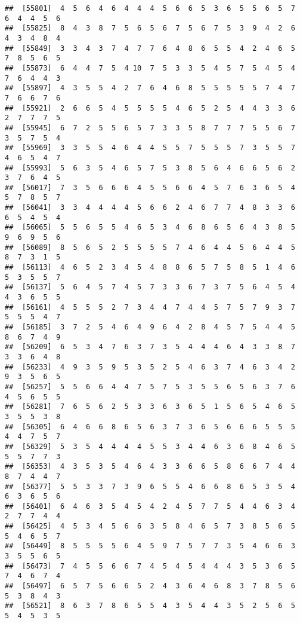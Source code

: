 \documentclass[
]{book}
\begin{document}
\begin{verbatim}
##  [55801]  4  5  6  4  6  4  4  4  5  6  6  5  3  6  5  5  6  5  7  6  4  4  5  6
##  [55825]  8  4  3  8  7  5  6  5  6  7  5  6  7  5  3  9  4  2  6  4  3  4  8  4
##  [55849]  3  3  4  3  7  4  7  7  6  4  8  6  5  5  4  2  4  6  5  7  8  5  6  5
##  [55873]  6  4  4  7  5  4 10  7  5  3  3  5  4  5  7  5  4  5  4  7  6  4  4  3
##  [55897]  4  3  5  5  4  2  7  6  4  6  8  5  5  5  5  5  7  4  7  7  6  6  7  6
##  [55921]  2  6  6  5  4  5  5  5  5  4  6  5  2  5  4  4  3  3  6  2  7  7  7  5
##  [55945]  6  7  2  5  5  6  5  7  3  3  5  8  7  7  7  5  5  6  7  3  5  7  5  4
##  [55969]  3  3  5  5  4  6  4  4  5  5  7  5  5  5  7  3  5  5  7  4  6  5  4  7
##  [55993]  5  6  3  5  4  6  5  7  5  3  8  5  6  4  6  6  5  6  2  3  7  6  4  5
##  [56017]  7  3  5  6  6  6  4  5  5  6  6  4  5  7  6  3  6  5  4  5  7  8  5  7
##  [56041]  3  3  4  4  4  4  5  6  6  2  4  6  7  7  4  8  3  3  6  6  5  4  5  4
##  [56065]  5  5  6  5  5  4  6  5  3  4  6  8  6  5  6  4  3  8  5  9  6  9  5  6
##  [56089]  8  5  6  5  2  5  5  5  5  7  4  6  4  4  5  6  4  4  5  8  7  3  1  5
##  [56113]  4  6  5  2  3  4  5  4  8  8  6  5  7  5  8  5  1  4  6  5  3  5  5  7
##  [56137]  5  6  4  5  7  4  5  7  3  3  6  7  3  7  5  6  4  5  4  4  3  6  5  5
##  [56161]  4  5  5  5  2  7  3  4  4  7  4  4  5  7  5  7  9  3  7  5  5  5  4  7
##  [56185]  3  7  2  5  4  6  4  9  6  4  2  8  4  5  7  5  4  4  5  8  6  7  4  9
##  [56209]  6  5  3  4  7  6  3  7  3  5  4  4  4  6  4  3  3  8  7  3  3  6  4  8
##  [56233]  4  9  3  5  9  5  3  5  2  5  4  6  3  7  4  6  3  4  2  9  3  5  6  5
##  [56257]  5  5  6  6  4  4  7  5  7  5  3  5  5  6  5  6  3  7  6  4  5  6  5  5
##  [56281]  7  6  5  6  2  5  3  3  6  3  6  5  1  5  6  5  4  6  5  3  5  5  3  8
##  [56305]  6  4  6  6  8  6  5  6  3  7  3  6  5  6  6  6  5  5  5  4  4  7  5  7
##  [56329]  5  3  5  4  4  4  4  5  5  3  4  4  6  3  6  8  4  6  5  5  5  7  7  3
##  [56353]  4  3  5  3  5  4  6  4  3  3  6  6  5  8  6  6  7  4  4  8  7  4  4  7
##  [56377]  5  5  3  3  7  3  9  6  5  5  4  6  6  8  6  5  3  5  4  6  3  6  5  6
##  [56401]  6  4  6  3  5  4  5  4  2  4  5  7  7  5  4  4  6  3  4  2  7  7  4  4
##  [56425]  4  5  3  4  5  6  6  3  5  8  4  6  5  7  3  8  5  6  5  5  4  6  5  7
##  [56449]  8  5  5  5  5  6  4  5  9  7  5  7  7  3  5  4  6  6  3  3  5  5  6  5
##  [56473]  7  4  5  5  6  6  7  4  5  4  5  4  4  4  3  5  3  6  5  7  4  6  7  4
##  [56497]  6  5  7  5  6  6  5  2  4  3  6  4  6  8  3  7  8  5  6  5  3  8  4  3
##  [56521]  8  6  3  7  8  6  5  5  4  3  5  4  4  3  5  2  5  6  5  5  4  5  3  5

\end{verbatim}
\end{document}
